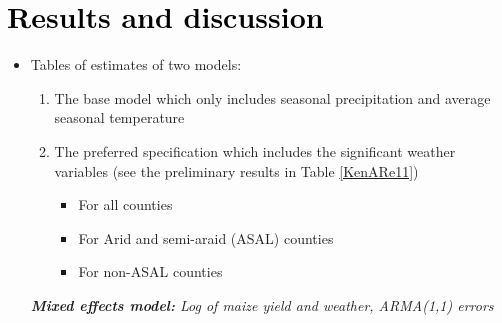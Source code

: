 \documentclass[a4paper,12pt]{article}
\begin{document}
	\section{\textcolor{black}{Results and discussion}}\label{Results}


\color{blue}
\begin{itemize}

\item Tables of estimates of two models:

\begin{enumerate}
\item The base model which only includes seasonal precipitation and average seasonal temperature
\item The preferred specification which includes the significant weather variables (see the preliminary results in Table \ref{KenARe11}) 

\begin{itemize}
\item For all counties 
\item For Arid and semi-araid (ASAL) counties
\item For non-ASAL counties
\end{itemize}
\end{enumerate}

\color{black}

{
\begin{threeparttable}
\singlespacing
\caption{\textit{\textbf{Mixed  effects model:} Log of maize yield and weather, ARMA(1,1) errors}}
\label{KenARe11} 
\begin{footnotesize}

\begin{tabular}{llrlllr} 


\end{tabular}
\end{footnotesize}
\end{threeparttable}}
\end{itemize}
\end{document}

